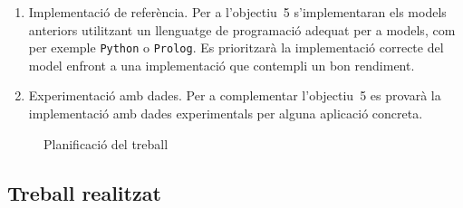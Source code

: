 \begin{enumerate}
\item Implementació de referència. Per a l'objectiu~5 s'implementaran
  els models anteriors utilitzant un llenguatge de programació adequat
  per a models, com per exemple \texttt{Python} o \texttt{Prolog}.  Es
  prioritzarà la implementació correcte del model enfront a una
  implementació que contempli un bon rendiment. 

\item Experimentació amb dades. Per a complementar l'objectiu~5 es
  provarà la implementació amb dades experimentals per alguna
  aplicació concreta.

\end{enumerate}

\begin{figure}[tp]
\centering
{}
\caption{Planificació del treball}
\label{fig:pla:futur}
\end{figure}



\subsection{Treball realitzat}


